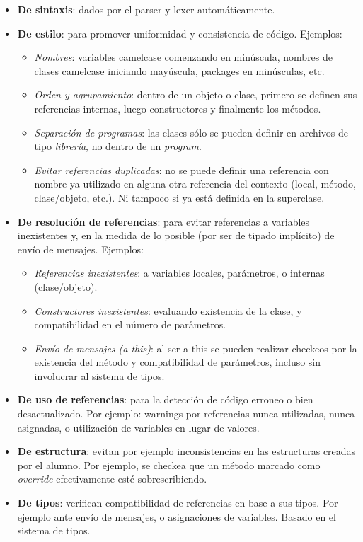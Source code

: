 \begin{itemize}
   \item \textbf{De sintaxis}: dados por el parser y lexer automáticamente.
  \item \textbf{De estilo}: para promover uniformidad y consistencia de código.
  Ejemplos:
  		\begin{itemize}
  			\item \textit{Nombres}: variables camelcase comenzando en minúscula,
  			nombres de clases camelcase iniciando mayúscula, packages en minúsculas, etc.
  			\item \textit{Orden y agrupamiento}: dentro de un objeto o clase, primero
  			se definen sus referencias internas, luego constructores y finalmente los métodos.
  			\item \textit{Separación de programas}: las clases sólo se pueden definir
  			en archivos de tipo \textit{librería}, no dentro de un \textit{program}.
  			\item \textit{Evitar referencias duplicadas}: no se puede definir una
  			referencia con nombre ya utilizado en alguna otra referencia del contexto (local, método,
  			clase/objeto, etc.). Ni tampoco si ya está definida en la superclase.
		\end{itemize}
  \item \textbf{De resolución de referencias}: para evitar referencias a
  variables inexistentes y, en la medida de lo posible (por ser de tipado
  implícito) de envío de mensajes. Ejemplos:
  		\begin{itemize}
		  \item \textit{Referencias inexistentes}: a variables locales, parámetros, o
		  internas (clase/objeto).
		  \item \textit{Constructores inexistentes}: evaluando existencia de la
		  clase, y compatibilidad en el número de paråmetros.
		  \item \textit{Envío de mensajes (a this)}: al ser a this se pueden realizar
		  checkeos por la existencia del método y compatibilidad de parámetros, incluso sin
		  involucrar al sistema de tipos.
		\end{itemize}
  \item \textbf{De uso de referencias}: para la detección de código
  	erroneo o bien desactualizado. Por ejemplo: warnings por referencias nunca
 	utilizadas, nunca asignadas, o utilización de variables en lugar de valores.
  \item \textbf{De estructura}: evitan por ejemplo inconsistencias en las
  estructuras creadas por el alumno. Por ejemplo, se checkea
  que un método marcado como \textit{override} efectivamente esté
	sobrescribiendo.
  \item \textbf{De tipos}: verifican compatibilidad de referencias en base a sus
  tipos. Por ejemplo ante envío de mensajes, o asignaciones de variables. Basado
  en el sistema de tipos.
\end{itemize}



